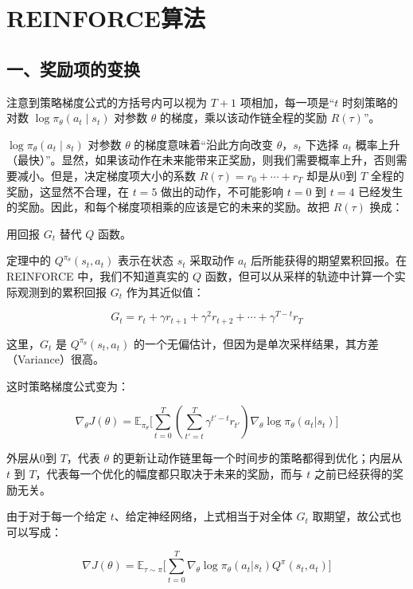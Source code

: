 \clearpage

\hypertarget{reinforceux7b97ux6cd5}{%
\section{REINFORCE算法}\label{reinforceux7b97ux6cd5}}

\hypertarget{ux4e00ux5956ux52b1ux9879ux7684ux53d8ux6362}{%
\subsection{一、奖励项的变换}\label{ux4e00ux5956ux52b1ux9879ux7684ux53d8ux6362}}

注意到策略梯度公式的方括号内可以视为 \(T+1\) 项相加，每一项是``\(t\) 时刻策略的对数 \(\log\pi_\theta(a_t\mid s_t)\) 对参数 \(\theta\) 的梯度，乘以该动作链全程的奖励 \(R(\tau)\)''。

\(\log\pi_\theta(a_t\mid s_t)\) 对参数 \(\theta\) 的梯度意味着``沿此方向改变 \(\theta\)，\(s_t\) 下选择 \(a_t\) 概率上升（最快）''。显然，如果该动作在未来能带来正奖励，则我们需要概率上升，否则需要减小。但是，决定梯度项大小的系数 \(R(\tau)=r_0+\cdots+r_T\) 却是从0到 \(T\) 全程的奖励，这显然不合理，在 \(t=5\) 做出的动作，不可能影响 \(t=0\) 到 \(t=4\) 已经发生的奖励。因此，和每个梯度项相乘的应该是它的未来的奖励。故把 \(R(\tau)\) 换成：

用回报 \(G_t\) 替代 \(Q\) 函数。

定理中的 \(Q^{\pi_\theta}(s_t,a_t)\) 表示在状态 \(s_t\) 采取动作 \(a_t\) 后所能获得的期望累积回报。在 REINFORCE 中，我们不知道真实的 \(Q\) 函数，但可以从采样的轨迹中计算一个实际观测到的累积回报 \(G_t\) 作为其近似值：

\[
G_t=r_t+\gamma r_{t+1}+\gamma^{2}r_{t+2}+\cdots+\gamma^{T-t}r_T
\]

这里，\(G_t\) 是 \(Q^{\pi_\theta}(s_t,a_t)\) 的一个无偏估计，但因为是单次采样结果，其方差（Variance）很高。

这时策略梯度公式变为：

\[
\nabla_\theta J(\theta)
=\mathbb{E}_{\pi_\theta}
\bigl[
\sum_{t=0}^{T}
(\sum_{t'=t}^{T}\gamma^{t'-t}r_{t'})
\nabla_\theta\log\pi_\theta(a_t|s_t)
\bigr]
\]

外层从0到 \(T\)，代表 \(\theta\) 的更新让动作链里每一个时间步的策略都得到优化；内层从 \(t\) 到 \(T\)，代表每一个优化的幅度都只取决于未来的奖励，而与 \(t\) 之前已经获得的奖励无关。

由于对于每一个给定 \(t\)、给定神经网络，上式相当于对全体 \(G_t\) 取期望，故公式也可以写成：

\[
\nabla J(\theta)
=\mathbb{E}_{\tau\sim\pi}
\bigl[
\sum_{t=0}^{T}
\nabla_\theta\log\pi_\theta(a_t|s_t)Q^{\pi}(s_t,a_t)
\bigr]
\]

